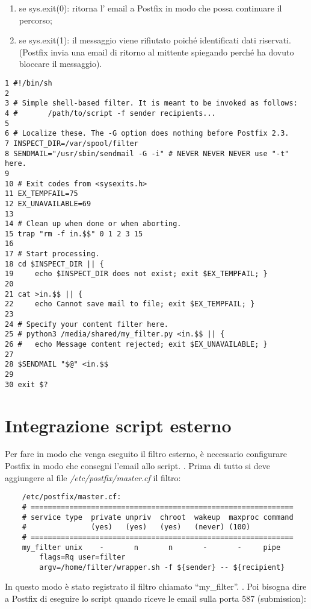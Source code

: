     
    \begin{enumerate}
        \item se sys.exit(0): ritorna l' email a Postfix in modo che possa continuare il percorso;
        \item se sys.exit(1): il messaggio viene rifiutato poiché identificati dati riservati. 
        (Postfix invia una email di ritorno al mittente spiegando perché ha dovuto bloccare il messaggio). 
    \end{enumerate}

    \begin{verbatim}
1 #!/bin/sh
2 
3 # Simple shell-based filter. It is meant to be invoked as follows:
4 #       /path/to/script -f sender recipients...
5 
6 # Localize these. The -G option does nothing before Postfix 2.3.
7 INSPECT_DIR=/var/spool/filter
8 SENDMAIL="/usr/sbin/sendmail -G -i" # NEVER NEVER NEVER use "-t" here.
9 
10 # Exit codes from <sysexits.h>
11 EX_TEMPFAIL=75
12 EX_UNAVAILABLE=69
13 
14 # Clean up when done or when aborting.
15 trap "rm -f in.$$" 0 1 2 3 15
16 
17 # Start processing.
18 cd $INSPECT_DIR || {
19     echo $INSPECT_DIR does not exist; exit $EX_TEMPFAIL; }
20 
21 cat >in.$$ || { 
22     echo Cannot save mail to file; exit $EX_TEMPFAIL; }
23 
24 # Specify your content filter here.
25 # python3 /media/shared/my_filter.py <in.$$ || {
26 #   echo Message content rejected; exit $EX_UNAVAILABLE; }
27 
28 $SENDMAIL "$@" <in.$$
29 
30 exit $?
    \end{verbatim}

    \section{Integrazione script esterno}
    Per fare in modo che venga eseguito il filtro esterno, è necessario configurare Postfix in modo
    che consegni l'email allo script.
    \newline
    . Prima di tutto si deve aggiungere al file \textit{/etc/postfix/master.cf} il filtro:

    \begin{verbatim}
    /etc/postfix/master.cf:
    # =============================================================
    # service type  private unpriv  chroot  wakeup  maxproc command
    #               (yes)   (yes)   (yes)   (never) (100)
    # =============================================================
    my_filter unix	  -	      n	      n	      -	      -	    pipe
	    flags=Rq user=filter 
        argv=/home/filter/wrapper.sh -f ${sender} -- ${recipient}
    \end{verbatim}
    In questo modo è stato registrato il filtro chiamato ``my\_filter''.
    \newline
    . Poi bisogna dire a Postfix di eseguire lo script quando riceve le email sulla porta 587 (submission):


